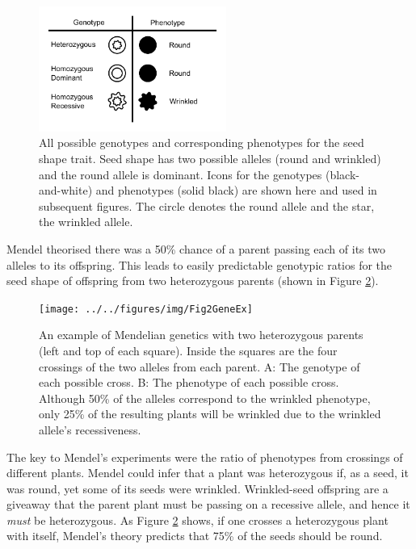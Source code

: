 \documentclass[english,floatsintext,man]{apa6}
\theoremstyle{definition}
\theoremstyle{definition}
\theoremstyle{definition}
\theoremstyle{remark}
\begin{document}
\begin{figure}
\includegraphics[width=2.42in]{../../figures/img/Fig1IconKey} \caption{All possible genotypes and corresponding phenotypes for the seed shape trait. Seed shape has two possible alleles (round and wrinkled) and the round allele is dominant. Icons for the genotypes (black-and-white) and phenotypes (solid black) are shown here and used in subsequent figures. The circle denotes the round allele and the star, the wrinkled allele.}\label{fig:MendelKey}
\end{figure}

Mendel theorised there was a 50\% chance of a parent passing each of its
two alleles to its offspring. This leads to easily predictable genotypic
ratios for the seed shape of offspring from two heterozygous parents
(shown in Figure \ref{fig:MendelGenes}).

\begin{figure}
\texttt{[image: ../../figures/img/Fig2GeneEx]} \caption{An example of Mendelian genetics with two heterozygous parents (left and top of each square). Inside the squares are the four crossings of the two alleles from each parent. A: The genotype of each possible cross. B: The phenotype of each possible cross. Although 50\% of the alleles correspond to the wrinkled phenotype, only 25\% of the resulting plants will be wrinkled due to the wrinkled allele's recessiveness.}\label{fig:MendelGenes}
\end{figure}

The key to Mendel's experiments were the ratio of phenotypes from
crossings of different plants. Mendel could infer that a plant was
heterozygous if, as a seed, it was round, yet some of its seeds were
wrinkled. Wrinkled-seed offspring are a giveaway that the parent plant
must be passing on a recessive allele, and hence it \emph{must} be
heterozygous. As Figure \ref{fig:MendelGenes} shows, if one crosses a
heterozygous plant with itself, Mendel's theory predicts that 75\% of
the seeds should be round.
\end{document}
